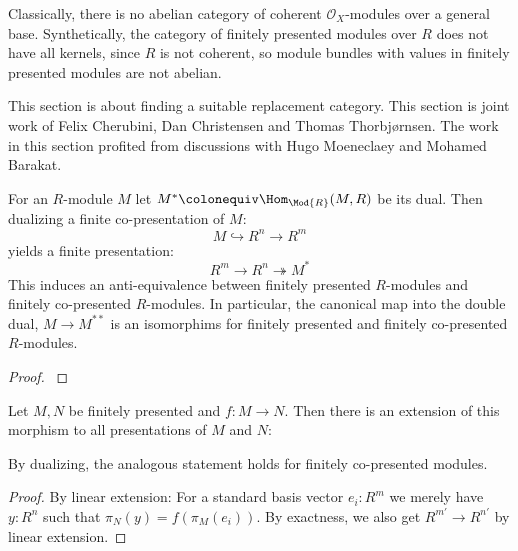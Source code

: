 

Classically, there is no abelian category of coherent $\mathcal O_X$-modules over a general base.
Synthetically, the category of finitely presented modules over $R$ does not have all kernels,
since $R$ is not coherent, so module bundles with values in finitely presented modules are not abelian.

This section is about finding a suitable replacement category.
This section is joint work of Felix Cherubini, Dan Christensen and Thomas Thorbjørnsen.
The work in this section profited from discussions with Hugo Moeneclaey and Mohamed Barakat.

\begin{theorem}
  For an $R$-module $M$ let $M^\ast\colonequiv \Hom_{\Mod{R}}(M,R)$ be its dual.
  Then dualizing a finite co-presentation of $M$:
  \[ M \hookrightarrow R^n \to R^m \]
  yields a finite presentation:
  \[ R^m \to R^n \twoheadrightarrow M^\ast \]
  This induces an anti-equivalence between finitely presented $R$-modules and finitely co-presented $R$-modules. In particular, the canonical map into the double dual, $M\to M^{\ast\ast}$ is an isomorphims for finitely presented and finitely co-presented $R$-modules.
\end{theorem}

\begin{proof}
  \cite{diffgeo-article}
\end{proof}


\begin{lemma}
  \label{presentation-extension}
  Let $M,N$ be finitely presented and $f:M\to N$.
  Then there is an extension of this morphism to all presentations of $M$ and $N$:
  \begin{center}
  \end{center}
  By dualizing, the analogous statement holds for finitely co-presented modules.
\end{lemma}

\begin{proof}
  By linear extension: For a standard basis vector $e_i:R^m$ we merely have $y:R^n$ such that $\pi_N(y)=f(\pi_M(e_i))$. By exactness, we also get $R^{m'}\to R^{n'}$ by linear extension.
\end{proof}

